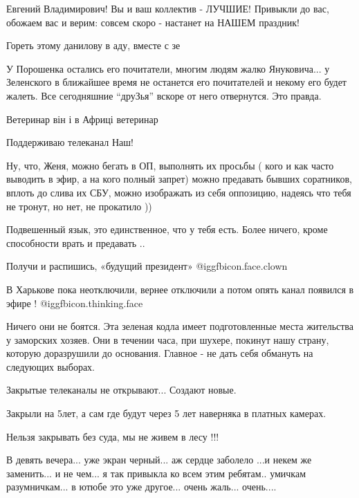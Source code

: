 \begin{itemize}

Евгений Владимирович! Вы и ваш коллектив - ЛУЧШИЕ! Привыкли до вас, обожаем вас
и верим: совсем скоро - настанет на НАШЕМ праздник!

Гореть этому данилову в аду, вместе с зе


У Порошенка остались его почитатели, многим людям жалко Януковича... у
Зеленского в ближайшее время не останется его почитателей и некому его будет
жалеть. Все сегодняшние \enquote{друЗья} вскоре от него отвернутся. Это правда.

Ветеринар він і в Африці ветеринар

Поддерживаю телеканал Наш!


Ну, что, Женя, можно бегать в ОП, выполнять их просьбы ( кого и как часто
выводить в эфир, а на кого полный запрет) можно предавать бывших соратников,
вплоть до слива их СБУ, можно изображать из себя оппозицию, надеясь что тебя не
тронут, но нет, не прокатило ))

Подвешенный язык, это единственное, что у тебя есть. Более ничего, кроме
способности врать и предавать ..

Получи и распишись, «будущий президент»  @igg{fbicon.face.clown} 


В Харькове пока неотключили, вернее отключили а потом опять канал появился в
эфире ! @igg{fbicon.thinking.face} 


Ничего они не боятся. Эта зеленая кодла имеет подготовленные места жительства у
заморских хозяев. Они в течении часа, при шухере, покинут нашу страну, которую
доразрушили до основания. Главное - не дать себя обмануть на следующих выборах.

Закрытые телеканалы не открывают... Создают новые.

Закрыли на 5лет, а сам где будут через 5 лет наверняка в платных камерах.

Нельзя закрывать без суда, мы не живем в лесу !!!


В девять вечера... уже экран черный... аж сердце заболело ...и некем же
заменить... и не чем... я так привыкла ко всем этим ребятам.. умичкам
разумничкам... в ютюбе это уже другое... очень жаль... очень....


\end{itemize} %
